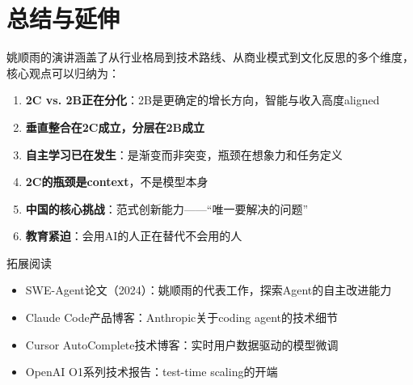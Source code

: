 \section{总结与延伸}

姚顺雨的演讲涵盖了从行业格局到技术路线、从商业模式到文化反思的多个维度，核心观点可以归纳为：

\begin{enumerate}
\item \textbf{2C vs. 2B正在分化}：2B是更确定的增长方向，智能与收入高度aligned
\item \textbf{垂直整合在2C成立，分层在2B成立}
\item \textbf{自主学习已在发生}：是渐变而非突变，瓶颈在想象力和任务定义
\item \textbf{2C的瓶颈是context}，不是模型本身
\item \textbf{中国的核心挑战}：范式创新能力——``唯一要解决的问题''
\item \textbf{教育紧迫}：会用AI的人正在替代不会用的人
\end{enumerate}

\begin{knowledgebox}{拓展阅读}
\begin{itemize}
\item SWE-Agent论文（2024）：姚顺雨的代表工作，探索Agent的自主改进能力
\item Claude Code产品博客：Anthropic关于coding agent的技术细节
\item Cursor AutoComplete技术博客：实时用户数据驱动的模型微调
\item OpenAI O1系列技术报告：test-time scaling的开端
\end{itemize}
\end{knowledgebox}



